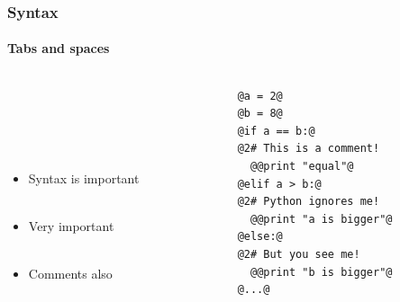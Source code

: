 \documentclass{beamer}
\begin{document}
\begin{frame}[fragile]
\frametitle{Syntax}
\framesubtitle{Tabs and spaces}
\large
  \begin{columns}[T]
    \begin{column}{.5\textwidth} 
\ \\ 

\ \\ 

\ \\ 
\ \\

\begin{itemize}


\item Syntax is important \ \\
\ \\ 
\item Very important \ \\
\ \\
\item<2-> Comments also



\end{itemize}
     \end{column}
     
         \begin{column}{.5\textwidth} 
\begin{lstlisting}[style=base]
@a = 2@
@b = 8@
@if a == b:@
@2# This is a comment!
  @@print "equal"@
@elif a > b:@
@2# Python ignores me!
  @@print "a is bigger"@
@else:@
@2# But you see me!
  @@print "b is bigger"@
@...@
\end{lstlisting}

    \end{column}
    \end{columns}

\end{frame}
\end{document}
